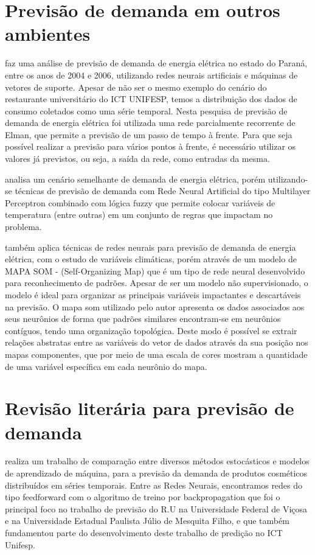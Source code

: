 \documentclass[	12pt, Times, openright, twoside, a4paper, english, brazil]{abntex2}
\begin{document}
      \section{Previsão de demanda em outros ambientes} 
         \cite{RUAS2012} faz uma análise de previsão de demanda de energia elétrica no estado do Paraná, entre os anos de 2004 e 2006, utilizando redes neurais artificiais e máquinas de vetores de suporte. Apesar de não ser o mesmo exemplo do cenário do restaurante universitário do ICT UNIFESP, temos a distribuição dos dados de consumo coletados como uma série temporal. Nesta pesquisa de previsão de demanda de energia elétrica foi utilizada uma rede parcialmente recorrente de Elman, que permite a previsão de um passo de tempo à frente. Para que seja possível realizar a previsão para vários pontos à frente, é necessário utilizar os valores já previstos, ou seja, a saída da rede, como entradas da mesma.
        
         \cite{Almeida2013} analisa um cenário semelhante de demanda de energia elétrica, porém utilizando-se técnicas de previsão de demanda com Rede Neural Artificial do tipo Multilayer Perceptron combinado com lógica fuzzy que permite colocar variáveis de temperatura (entre outras) em um conjunto de regras que impactam no problema.
        
       \cite{Silva2010} também aplica técnicas de redes neurais para previsão de demanda de energia elétrica, com o estudo de variáveis climáticas, porém através de um modelo de MAPA SOM - (Self-Organizing Map) que é um tipo de rede neural desenvolvido para reconhecimento de padrões. Apesar de ser um modelo não supervisionado, o modelo é ideal para organizar as principais variáveis impactantes e descartáveis na previsão. O mapa som utilizado pelo autor apresenta os dados associados aos seus neurônios de forma que padrões similares encontram-se em neurônios contíguos, tendo uma organização topológica. Deste modo é possível se extrair relações abstratas entre as variáveis do vetor de dados através da sua posição nos mapas componentes, que por meio de uma escala de cores mostram a quantidade de uma variável específica em cada neurônio do mapa.
       
       \section{Revisão literária para previsão de demanda}
        \cite{Junior2007} realiza um trabalho de comparação entre diversos métodos estocásticos e modelos de aprendizado de máquina, para a previsão da demanda de produtos cosméticos distribuídos em séries temporais. Entre as Redes Neurais, encontramos redes do tipo feedforward com o algoritmo de treino por backpropagation que foi o principal foco no trabalho de previsão do R.U na Universidade Federal de Viçosa e na Universidade Estadual Paulista Júlio de Mesquita Filho, e que também fundamentou parte do desenvolvimento deste trabalho de predição no ICT Unifesp.
\end{document}

